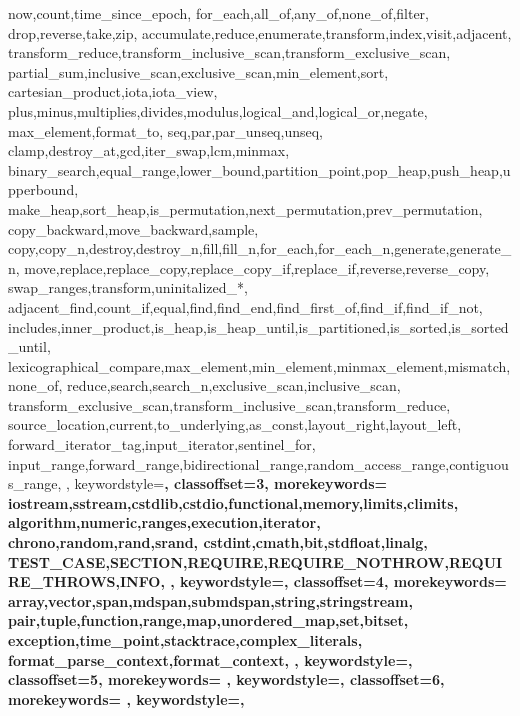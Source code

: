 {{    now,count,time_since_epoch,
    for_each,all_of,any_of,none_of,filter,
    drop,reverse,take,zip,
    accumulate,reduce,enumerate,transform,index,visit,adjacent,
    transform_reduce,transform_inclusive_scan,transform_exclusive_scan,
    partial_sum,inclusive_scan,exclusive_scan,min_element,sort,
    cartesian_product,iota,iota_view,
    plus,minus,multiplies,divides,modulus,logical_and,logical_or,negate,
    max_element,format_to,
    seq,par,par_unseq,unseq,
    clamp,destroy_at,gcd,iter_swap,lcm,minmax,
    binary_search,equal_range,lower_bound,partition_point,pop_heap,push_heap,upperbound,
    make_heap,sort_heap,is_permutation,next_permutation,prev_permutation,
    copy_backward,move_backward,sample,
    copy,copy_n,destroy,destroy_n,fill,fill_n,for_each,for_each_n,generate,generate_n,
    move,replace,replace_copy,replace_copy_if,replace_if,reverse,reverse_copy,
    swap_ranges,transform,uninitalized_*,
    adjacent_find,count_if,equal,find,find_end,find_first_of,find_if,find_if_not,
    includes,inner_product,is_heap,is_heap_until,is_partitioned,is_sorted,is_sorted_until,
    lexicographical_compare,max_element,min_element,minmax_element,mismatch,none_of,
    reduce,search,search_n,exclusive_scan,inclusive_scan,
    transform_exclusive_scan,transform_inclusive_scan,transform_reduce,
    source_location,current,to_underlying,as_const,layout_right,layout_left,
    forward_iterator_tag,input_iterator,sentinel_for,
    input_range,forward_range,bidirectional_range,random_access_range,contiguous_range,
  },
  keywordstyle=\bfseries\color{jade},
  classoffset=3,
  morekeywords={
    iostream,sstream,cstdlib,cstdio,functional,memory,limits,climits,
    algorithm,numeric,ranges,execution,iterator,
    chrono,random,rand,srand,
    cstdint,cmath,bit,stdfloat,linalg,
    TEST_CASE,SECTION,REQUIRE,REQUIRE_NOTHROW,REQUIRE_THROWS,INFO,
  },
  keywordstyle=\bfseries\color{green!40!blue!60},
  classoffset=4,
  morekeywords={
    array,vector,span,mdspan,submdspan,string,stringstream,
    pair,tuple,function,range,map,unordered_map,set,bitset,
    exception,time_point,stacktrace,complex_literals,
    format_parse_context,format_context,
  },
  keywordstyle=\bfseries\color{amethyst},
  classoffset=5,
  morekeywords={
  },
  keywordstyle=\bfseries\color{green!40!red!60},
  classoffset=6,
  morekeywords={
  },
  keywordstyle=\bfseries\color{lavender(floral)},
}
\newcommand\lstcstd[1]{\lstinline{std::#1}}

